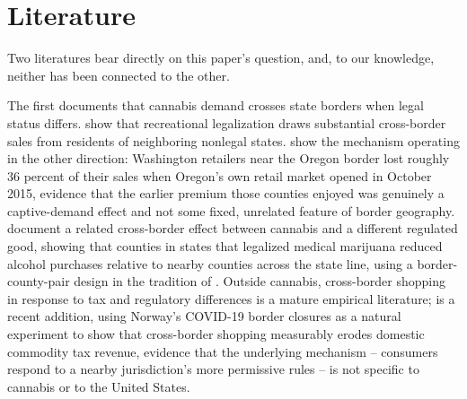 \documentclass[12pt]{article}
\begin{document}
\section{Literature}
\label{sec:lit}

Two literatures bear directly on this paper's question, and, to our knowledge, neither has been connected to
the other.

The first documents that cannabis demand crosses state borders when legal status differs. \citet{HaoCowan2020}
show that recreational legalization draws substantial cross-border sales from residents of neighboring
nonlegal states. \citet{HansenMillerWeber2020} show the mechanism operating in the other direction: Washington
retailers near the Oregon border lost roughly 36 percent of their sales when Oregon's own retail market opened
in October 2015, evidence that the earlier premium those counties enjoyed was genuinely a captive-demand effect
and not some fixed, unrelated feature of border geography. \citet{BaggioChongKwon2020} document a related
cross-border effect between cannabis and a different regulated good, showing that counties in states that
legalized medical marijuana reduced alcohol purchases relative to nearby counties across the state line, using
a border-county-pair design in the tradition of \citet{DubeLesterReich2010}. Outside cannabis, cross-border
shopping in response to tax and regulatory differences is a mature empirical literature; \citet{FribergEtAl2024}
is a recent addition, using Norway's COVID-19 border closures as a natural experiment to show that cross-border
shopping measurably erodes domestic commodity tax revenue, evidence that the underlying mechanism -- consumers
respond to a nearby jurisdiction's more permissive rules -- is not specific to cannabis or to the United States.
\end{document}
